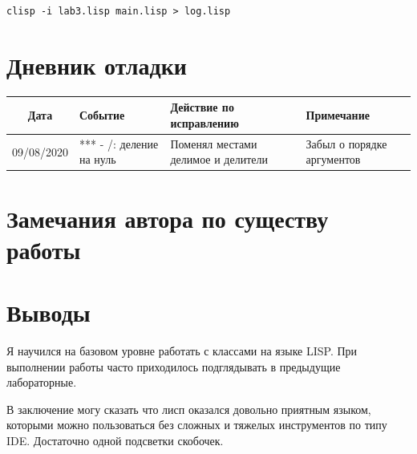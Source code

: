 \documentclass[12pt]{article}
\begin{document}
\lstinline{clisp -i lab3.lisp main.lisp > log.lisp}

\section{Дневник отладки}
\noindent
\begin{tabularx}{\linewidth}{|c|X|X|X|}
\hline
Дата & Событие & Действие по исправлению & Примечание \\
\hline
09/08/2020 & *** - /: деление на нуль & Поменял местами делимое и делители & Забыл о порядке аргументов \\
\hline
\end{tabularx}

\section{Замечания автора по существу работы}

\section{Выводы}

Я научился на базовом уровне работать с классами на языке LISP.
При выполнении работы часто приходилось подглядывать в предыдущие лабораторные.

В заключение могу сказать что лисп оказался довольно приятным языком, которыми можно пользоваться
без сложных и тяжелых инструментов по типу IDE. Достаточно одной подсветки скобочек.
\end{document}

